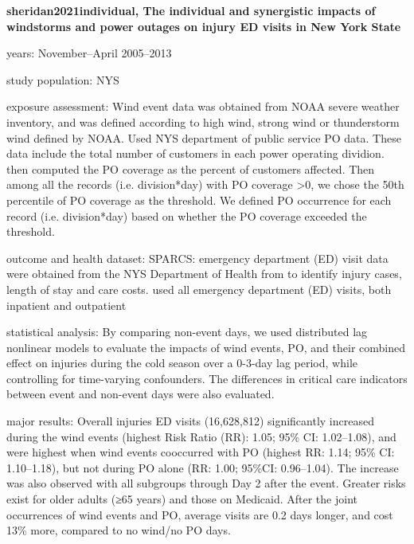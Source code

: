 \textbf{sheridan2021individual, The individual and synergistic impacts of windstorms and power outages on injury ED visits in New York State}
    \item years: November–April 2005–2013
    \item study population: NYS
    \item exposure assessment: Wind event data was obtained from NOAA severe weather inventory, and was defined according to high wind, strong wind or thunderstorm wind defined by NOAA. Used NYS department of public service PO data. These data include the total number of customers in each power operating dividion. then computed the PO coverage as the percent of customers affected. Then among all the records (i.e. division*day) with PO coverage >0, we chose the 50th percentile of PO coverage as the threshold. We defined PO occurrence for each record (i.e. division*day) based on whether the PO coverage exceeded the threshold.
    \item outcome and health dataset: SPARCS: emergency department (ED) visit data were obtained from the NYS Department of Health from  to identify injury cases, length of stay and care costs. used all emergency department (ED) visits, both inpatient and outpatient
    \item statistical analysis: By comparing non-event days, we used distributed lag nonlinear models to evaluate the impacts of wind events, PO, and their combined effect on injuries during the cold season over a 0-3-day lag period, while controlling for time-varying confounders. The differences in critical care indicators between event and non-event days were also evaluated.
    \item major results: Overall injuries ED visits (16,628,812) significantly increased during the wind events (highest Risk Ratio (RR): 1.05; 95\% CI: 1.02–1.08), and were highest when wind events cooccurred with PO (highest RR: 1.14; 95\% CI: 1.10–1.18), but not during PO alone (RR: 1.00; 95\%CI: 0.96–1.04). The increase was also observed with all subgroups through Day 2 after the event. Greater risks exist for older adults (≥65 years) and those on Medicaid. After the joint occurrences of wind events and PO, average visits are 0.2 days longer, and cost 13\% more, compared to no wind/no PO days.


